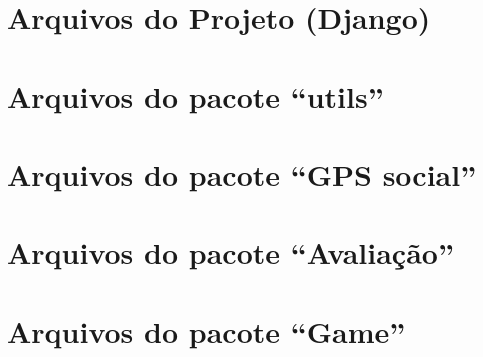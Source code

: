 \section{Arquivos do Projeto (Django)}


\clearpage
\section{Arquivos do pacote ``utils''}





\section{Arquivos do pacote ``GPS social''}




\clearpage
\section{Arquivos do pacote ``Avaliação''}




\clearpage
\section{Arquivos do pacote ``Game''}




